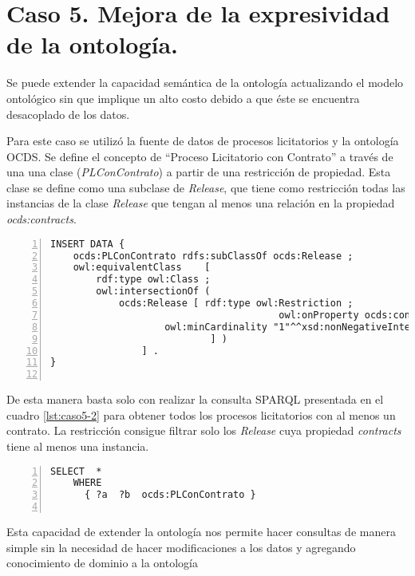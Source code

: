 \section{Caso 5. Mejora de la expresividad de la ontología. }

Se puede extender la capacidad semántica de la ontología actualizando el modelo ontológico sin que implique un alto costo debido a que éste se encuentra desacoplado de los datos.

Para este caso se utilizó la fuente de datos de procesos licitatorios y la ontología OCDS. Se define el concepto de “Proceso Licitatorio con Contrato” a través de una una clase (\textit{PLConContrato}) a partir de una restricción de propiedad. Esta clase se define como una subclase de \textit{Release}, que tiene como restricción todas las instancias de la clase \textit{Release} que tengan al menos una relación en la propiedad \textit{ocds:contracts}.


\begin{lstlisting}[captionpos=b, caption=Extension de la ontologia utilizando restricciones ontologicas, label={lst:caso5-1},  numbers=left,  numberstyle=\tiny\color{mygray},
    basicstyle=\small,frame=single]
INSERT DATA {
    ocds:PLConContrato rdfs:subClassOf ocds:Release ; 
    owl:equivalentClass    [ 
        rdf:type owl:Class ;
        owl:intersectionOf (   
            ocds:Release [ rdf:type owl:Restriction ;
                                        owl:onProperty ocds:contracts; 
                    owl:minCardinality "1"^^xsd:nonNegativeInteger ;
                            ] )
                ] .
}
    
 \end{lstlisting}

 De esta manera basta solo con realizar la consulta SPARQL presentada en el cuadro \ref{lst:caso5-2} para obtener todos los procesos licitatorios con al menos un contrato. La restricción consigue filtrar solo los \textit{Release} cuya propiedad \textit{contracts} tiene al menos una instancia.

 \begin{lstlisting}[captionpos=b, caption=Consulta SPARQL utilizando la Clase PLConContrato, label=lst:caso5-2,  numbers=left,  numberstyle=\tiny\color{mygray},
    basicstyle=\small,frame=single]
SELECT  *
    WHERE
      { ?a  ?b  ocds:PLConContrato }
    
 \end{lstlisting}

 Esta capacidad de extender la ontología nos permite hacer consultas de manera simple sin la necesidad de hacer modificaciones a los datos y agregando conocimiento de dominio a la ontología